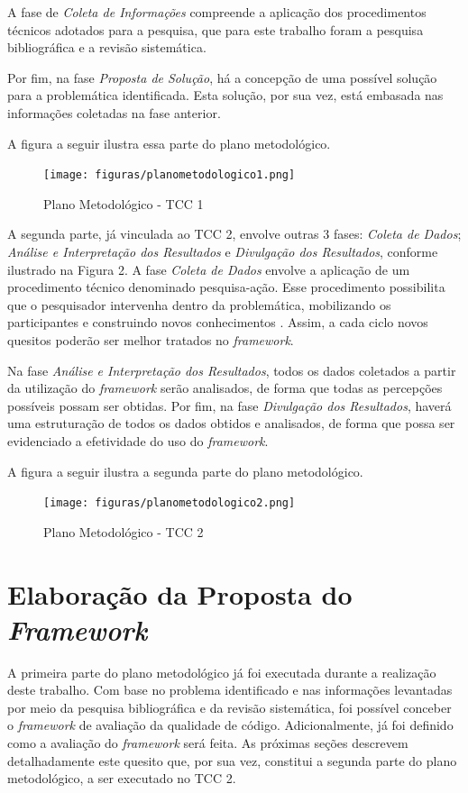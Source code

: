 A fase de \textit{Coleta de Informações} compreende a aplicação dos procedimentos técnicos adotados para a pesquisa, que para este trabalho foram a pesquisa bibliográfica e a revisão sistemática.

Por fim, na fase \textit{Proposta de Solução}, há a concepção de uma possível solução para a problemática identificada. Esta solução, por sua vez, está embasada nas informações coletadas na fase anterior.

A figura a seguir ilustra essa parte do plano metodológico.

\begin{figure}[h]
\texttt{[image: figuras/planometodologico1.png]}
\caption{Plano Metodológico - TCC 1}
\end{figure}

A segunda parte, já vinculada ao TCC 2, envolve outras 3 fases: \textit{Coleta de Dados}; \textit{Análise e Interpretação dos Resultados} e \textit{Divulgação dos Resultados}, conforme ilustrado na Figura 2.
A fase \textit{Coleta de Dados} envolve a aplicação de um procedimento técnico denominado pesquisa-ação. Esse procedimento possibilita que o pesquisador intervenha dentro da problemática, mobilizando os participantes e construindo novos conhecimentos \cite{pesquisa}. Assim, a cada ciclo novos quesitos poderão ser melhor tratados no \textit{framework}.

Na fase \textit{Análise e Interpretação dos Resultados}, todos os dados coletados a partir da utilização do \textit{framework} serão analisados, de forma que todas as percepções possíveis possam ser obtidas. Por fim, na fase \textit{Divulgação dos Resultados}, haverá uma estruturação de todos os dados obtidos e analisados, de forma que possa ser evidenciado a efetividade do uso do \textit{framework}.

A figura a seguir ilustra a segunda parte do plano metodológico.

\begin{figure}[h]
\texttt{[image: figuras/planometodologico2.png]}
\caption{Plano Metodológico - TCC 2}
\end{figure}

\section{Elaboração da Proposta do \textit{Framework}}

A primeira parte do plano metodológico já foi executada durante a realização deste trabalho. Com base no problema identificado e nas informações levantadas por meio da pesquisa bibliográfica e da revisão sistemática, foi possível conceber o \textit{framework} de avaliação da qualidade de código. Adicionalmente, já foi definido como a avaliação do \textit{framework} será feita. As próximas seções descrevem detalhadamente este quesito que, por sua vez, constitui a segunda parte do plano metodológico, a ser executado no TCC 2.

